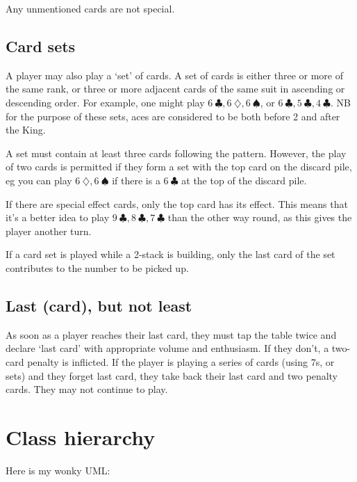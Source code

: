 \documentclass[fleqn,a4paper,11pt]{article}
\begin{document}
    Any unmentioned cards are not special.

    \subsection{Card sets} \label{rule:sets}

    A player may also play a `set' of cards. A set of cards is either three or
    more of the same rank, or three or more adjacent cards of the same suit in
    ascending or descending order. For example, one might play
    \(6\ \clubsuit, 6\ \diamondsuit, 6\ \spadesuit\), or
    \(6\ \clubsuit, 5\ \clubsuit, 4\ \clubsuit\). NB for the purpose of these
    sets, aces are considered to be both before 2 and after the King.

    A set must contain at least three cards following the pattern. However, the
    play of two cards is permitted if they form a set with the top card on the
    discard pile, eg you can play \(6\ \diamondsuit, 6\ \spadesuit\) if there is a
    \(6\ \clubsuit\) at the top of the discard pile.

    If there are special effect cards, only the top card has its effect. This
    means that it's a better idea to play
    \(9\ \clubsuit, 8\ \clubsuit, 7\ \clubsuit\)
    than the other way round, as this gives the player another turn.

    If a card set is played while a 2-stack is building, only the last card of
    the set contributes to the number to be picked up.

    \subsection{Last (card), but not least} \label{rule:lastcard}

    As soon as a player reaches their last card, they must tap the table twice
    and declare `last card' with appropriate volume and enthusiasm. If they
    don't, a two-card penalty is inflicted. If the player is playing a series
    of cards (using 7s, or sets) and they forget last card, they take back
    their last card and two penalty cards. They may not continue to play.

    \section{Class hierarchy}

    Here is my wonky UML:


\end{document}
